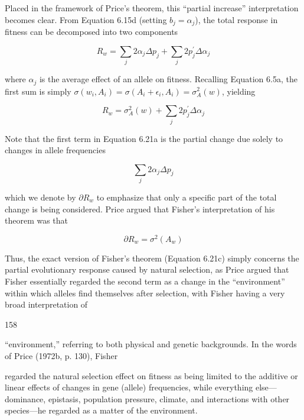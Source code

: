 \documentclass{article}
\begin{document}
Placed in the framework of Price’s theorem, this “partial increase” interpretation becomes clear. From Equation 6.15d (setting  $ b_j = \alpha_j $), the total response in fitness can be decomposed into two components

\begin{equation}
R_{w}=\sum_{j}2\alpha_{j}\Delta p_{j}+\sum_{j}2p_{j}^{\prime}\Delta\alpha_{j}
\tag{6.21a}
\label{eq:6_21a}
\end{equation}

where  $ \alpha_j $ is the average effect of an allele on fitness. Recalling Equation 6.5a, the first sum is simply  $ \sigma(w_i, A_i) = \sigma(A_i + \epsilon_i, A_i) = \sigma_A^2(w) $, yielding

\begin{equation}
R_{w}=\sigma_{A}^{2}(w)+\sum_{j}2p_{j}^{\prime}\Delta\alpha_{j}
\tag{6.21b}
\label{eq:6_21b}
\end{equation}

Note that the first term in Equation 6.21a is the partial change due solely to changes in allele frequencies

\begin{equation}
\sum_{j}2\alpha_{j}\Delta p_{j}
\end{equation}

which we denote by  $ \partial R_{w} $ to emphasize that only a specific part of the total change is being considered. Price argued that Fisher's interpretation of his theorem was that

\begin{equation}
\partial R_{w}=\sigma^{2}(A_{w})
\tag{6.21c}
\label{eq:6_21c}
\end{equation}

Thus, the exact version of Fisher’s theorem (Equation 6.21c) simply concerns the partial evolutionary response caused by natural selection, as Price argued that Fisher essentially regarded the second term as a change in the “environment” within which alleles find themselves after selection, with Fisher having a very broad interpretation of

158

“environment,” referring to both physical and genetic backgrounds. In the words of Price (1972b, p. 130), Fisher

regarded the natural selection effect on fitness as being limited to the additive or linear effects of changes in gene (allele) frequencies, while everything else—dominance, epistasis, population pressure, climate, and interactions with other species—he regarded as a matter of the environment.
\end{document}
